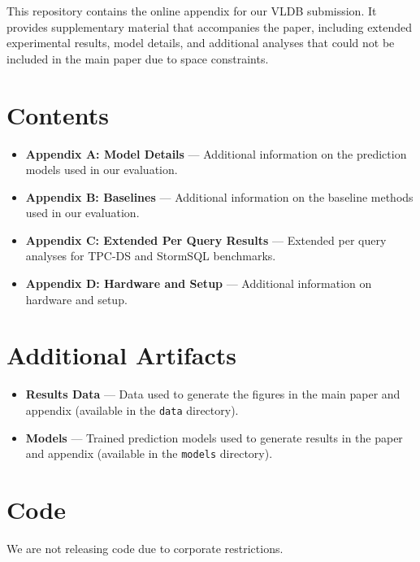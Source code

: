 
This repository contains the online appendix for our VLDB submission. It provides supplementary material that accompanies the paper, including extended experimental results, model details, and additional analyses that could not be included in the main paper due to space constraints.

\section*{Contents}

\begin{itemize}
    \item \textbf{Appendix A: Model Details} --- Additional information on the prediction models used in our evaluation.
    \item \textbf{Appendix B: Baselines} --- Additional information on the baseline methods used in our evaluation.
    \item \textbf{Appendix C: Extended Per Query Results} --- Extended per query analyses for TPC-DS and StormSQL benchmarks.
    \item \textbf{Appendix D: Hardware and Setup} --- Additional information on hardware and setup.
\end{itemize}

\section*{Additional Artifacts}

\begin{itemize}
    \item \textbf{Results Data} --- Data used to generate the figures in the main paper and appendix (available in the \texttt{data} directory).
    \item \textbf{Models} --- Trained prediction models used to generate results in the paper and appendix (available in the \texttt{models} directory).
\end{itemize}

\section*{Code}

We are not releasing code due to corporate restrictions.

